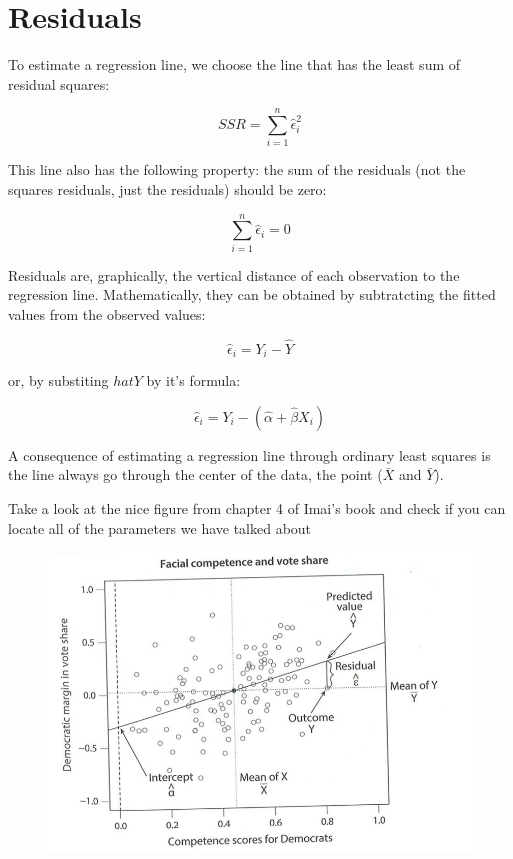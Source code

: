 \documentclass[11pt]{article}
\begin{document}
\section*{Residuals}

To estimate a regression line, we choose the line that has the least sum of residual squares: 

\[SSR = \sum_{i=1}^n \hat\epsilon_i^2\]

This line also has the following property: the sum of the residuals (not the squares residuals, just the residuals) should be zero:

\[\sum_{i=1}^n \hat\epsilon_i = 0\]

Residuals are, graphically, the vertical distance of each observation to the regression line. Mathematically, they can be obtained by subtratcting the fitted values from the observed values:

\[\hat\epsilon_i = Y_i - \hat Y\]

or, by substiting $hat Y$ by it's formula:

\[\hat\epsilon_i = Y_i - (\hat\alpha + \hat\beta X_i)\]

A consequence of estimating a regression line through ordinary least squares is the line always go through the center of the data, the point ($\bar X$ and $\bar Y$).

Take a look at the nice figure from chapter 4 of Imai's book and check if you can locate all of the parameters we have talked about 

\begin{figure}[htp]
\centering
\includegraphics[scale=0.70]{reg_imai.png}
\caption{}
\label{}
\end{figure}
\end{document}
